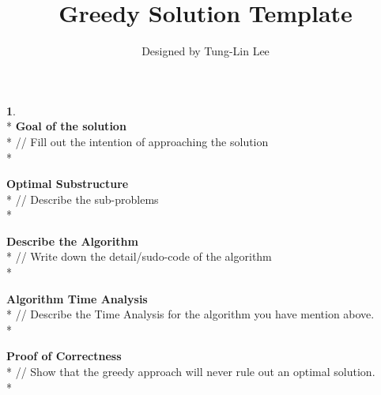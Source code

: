 \documentclass{article}
\title{Greedy Solution Template}
\author{Designed by Tung-Lin Lee}
\begin{document}
\maketitle %

\noindent
\textbf{1}.\\*
\textbf{Goal of the solution} \\*
// Fill out the intention of approaching the solution \\*

\noindent
\textbf{Optimal	Substructure} \\*
// Describe the sub-problems \\*

\noindent
\textbf{Describe the Algorithm} \\*
// Write down the detail/sudo-code of the algorithm \\*

\noindent
\textbf{Algorithm Time Analysis} \\*
// Describe the Time Analysis for the algorithm you have mention above. \\*

\noindent
\textbf{Proof of Correctness} \\*
// Show that the greedy approach will never rule out an optimal solution. \\*
\end{document}
